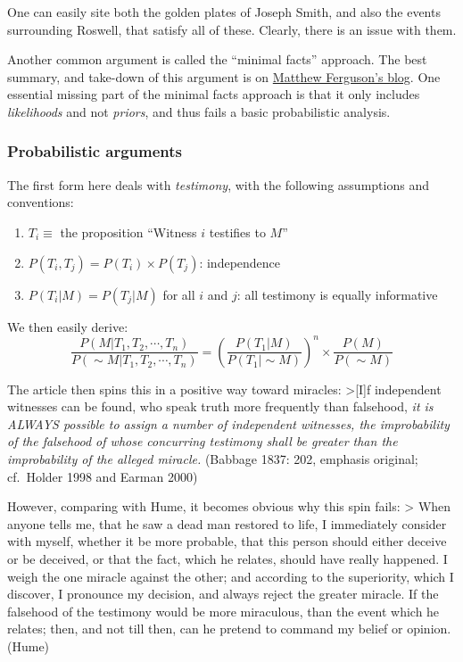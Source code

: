 One can easily site both the golden plates of Joseph Smith, and also the
events surrounding Roswell, that satisfy all of these. Clearly, there is
an issue with them.

Another common argument is called the ``minimal facts'' approach. The
best summary, and take-down of this argument is on
\href{https://adversusapologetica.wordpress.com/2013/06/29/knocking-out-the-pillars-of-the-minimal-facts-apologetic/}{Matthew
Ferguson's blog}. One essential missing part of the minimal facts
approach is that it only includes \emph{likelihoods} and not
\emph{priors}, and thus fails a basic probabilistic analysis.

\subsubsection{Probabilistic arguments}\label{probabilistic-arguments}

The first form here deals with \emph{testimony}, with the following
assumptions and conventions:

\begin{enumerate}
\def\labelenumi{\arabic{enumi}.}
\itemsep1pt\parskip0pt
\item
  \(T_i\equiv\) the proposition ``Witness \(i\) testifies to \(M\)''
\item
  \(P(T_i,T_j) = P(T_i)\times P(T_j)\): independence
\item
  \(P(T_i|M)=P(T_j|M)\) for all \(i\) and \(j\): all testimony is
  equally informative
\end{enumerate}

We then easily derive: \[
\frac{P(M|T_1,T_2,\cdots,T_n)}{P(\sim\!M|T_1,T_2,\cdots,T_n)} = \left(\frac{P(T_1|M)}{P(T_1|\sim\!M)}\right)^n \times \frac{P(M)}{P(\sim\!M)}
\]

The article then spins this in a positive way toward miracles:
\textgreater{}{[}I{]}f independent witnesses can be found, who speak
truth more frequently than falsehood, \emph{it is ALWAYS possible to
assign a number of independent witnesses, the improbability of the
falsehood of whose concurring testimony shall be greater than the
improbability of the alleged miracle.} (Babbage 1837: 202, emphasis
original; cf.~Holder 1998 and Earman 2000)

However, comparing with Hume, it becomes obvious why this spin fails:
\textgreater{} When anyone tells me, that he saw a dead man restored to
life, I immediately consider with myself, whether it be more probable,
that this person should either deceive or be deceived, or that the fact,
which he relates, should have really happened. I weigh the one miracle
against the other; and according to the superiority, which I discover, I
pronounce my decision, and always reject the greater miracle. If the
falsehood of the testimony would be more miraculous, than the event
which he relates; then, and not till then, can he pretend to command my
belief or opinion. (Hume)

